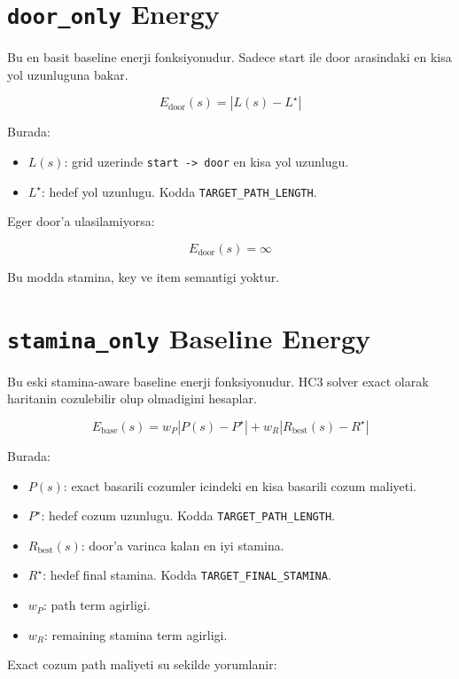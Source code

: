 \documentclass[11pt]{article}
\begin{document}
\section{\texttt{door\_only} Energy}

Bu en basit baseline enerji fonksiyonudur.
Sadece start ile door arasindaki en kisa yol uzunluguna bakar.

\[
E_{\text{door}}(s)
= \left| L(s) - L^\star \right|
\]

Burada:

\begin{itemize}
  \item $L(s)$: grid uzerinde \texttt{start -> door} en kisa yol uzunlugu.
  \item $L^\star$: hedef yol uzunlugu. Kodda \texttt{TARGET\_PATH\_LENGTH}.
\end{itemize}

Eger door'a ulasilamiyorsa:

\[
E_{\text{door}}(s) = \infty
\]

Bu modda stamina, key ve item semantigi yoktur.

\section{\texttt{stamina\_only} Baseline Energy}

Bu eski stamina-aware baseline enerji fonksiyonudur.
HC3 solver exact olarak haritanin cozulebilir olup olmadigini hesaplar.

\[
E_{\text{base}}(s)
=
w_P \left| P(s) - P^\star \right|
+
w_R \left| R_{\text{best}}(s) - R^\star \right|
\]

Burada:

\begin{itemize}
  \item $P(s)$: exact basarili cozumler icindeki en kisa basarili cozum maliyeti.
  \item $P^\star$: hedef cozum uzunlugu. Kodda \texttt{TARGET\_PATH\_LENGTH}.
  \item $R_{\text{best}}(s)$: door'a varinca kalan en iyi stamina.
  \item $R^\star$: hedef final stamina. Kodda \texttt{TARGET\_FINAL\_STAMINA}.
  \item $w_P$: path term agirligi.
  \item $w_R$: remaining stamina term agirligi.
\end{itemize}

Exact cozum path maliyeti su sekilde yorumlanir:
\end{document}
